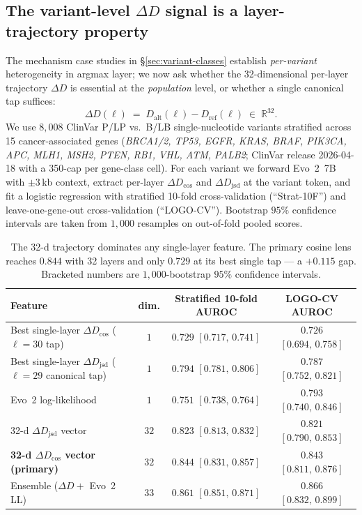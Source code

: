 \documentclass{article}
\theoremstyle{plain}
\theoremstyle{definition}
\theoremstyle{remark}
\newcommand{\DDcos}{\Delta D_{\cos}}
\newcommand{\DDjsd}{\Delta D_{\mathrm{jsd}}}
\begin{document}
\subsection{The variant-level $\Delta D$ signal is a layer-trajectory
            property}
\label{sec:variant-trajectory}

The mechanism case studies in \S\ref{sec:variant-classes} establish
\emph{per-variant} heterogeneity in argmax layer; we now ask whether
the 32-dimensional per-layer trajectory $\Delta D$ is essential at the
\emph{population} level, or whether a single canonical tap suffices:
\begin{equation}
  \Delta D(\ell) \;=\; D_{\mathrm{alt}}(\ell) - D_{\mathrm{ref}}(\ell)
  \;\in\;\mathbb{R}^{32}.
  \label{eq:DD}
\end{equation}
We use $8{,}008$ ClinVar P/LP vs.\ B/LB single-nucleotide variants
stratified across 15 cancer-associated genes (\emph{BRCA1/2, TP53,
EGFR, KRAS, BRAF, PIK3CA, APC, MLH1, MSH2, PTEN, RB1, VHL, ATM, PALB2};
ClinVar release 2026-04-18 with a 350-cap per gene-class cell). For
each variant we forward Evo~2~7B with $\pm 3$\,kb context, extract
per-layer $\DDcos$ and $\DDjsd$ at the variant token, and fit a
logistic regression with stratified 10-fold cross-validation
(``Strat-10F'') and leave-one-gene-out cross-validation (``LOGO-CV'').
Bootstrap $95\%$ confidence intervals are taken from $1{,}000$
resamples on out-of-fold pooled scores.

\begin{table}[t]
\caption{The 32-d trajectory dominates any single-layer feature. The
primary cosine lens reaches $0.844$ with 32 layers and only $0.729$ at
its best single tap --- a $+0.115$ gap. Bracketed numbers are
$1{,}000$-bootstrap $95\%$ confidence intervals.}
\label{tab:auroc}
\centering
\small
\begin{tabular}{@{}lccc@{}}
\toprule
Feature & dim. & Stratified 10-fold AUROC & LOGO-CV AUROC \\
\midrule
Best single-layer $\DDcos$ ($\ell=30$ tap) & $1$
   & $0.729$ $[0.717,\, 0.741]$
   & $0.726$ $[0.694,\, 0.758]$ \\
Best single-layer $\DDjsd$ ($\ell=29$ canonical tap) & $1$
   & $0.794$ $[0.781,\, 0.806]$
   & $0.787$ $[0.752,\, 0.821]$ \\
Evo~2 log-likelihood & $1$
   & $0.751$ $[0.738,\, 0.764]$
   & $0.793$ $[0.740,\, 0.846]$ \\
32-d $\DDjsd$ vector & $32$
   & $0.823$ $[0.813,\, 0.832]$
   & $0.821$ $[0.790,\, 0.853]$ \\
\textbf{32-d $\DDcos$ vector (primary)} & $32$
   & $\mathbf{0.844}$ $[0.831,\, 0.857]$
   & $\mathbf{0.843}$ $[0.811,\, 0.876]$ \\
Ensemble ($\Delta D + $ Evo~2 LL) & $33$
   & $0.861$ $[0.851,\, 0.871]$
   & $0.866$ $[0.832,\, 0.899]$ \\
\bottomrule
\end{tabular}
\end{table}
\end{document}
